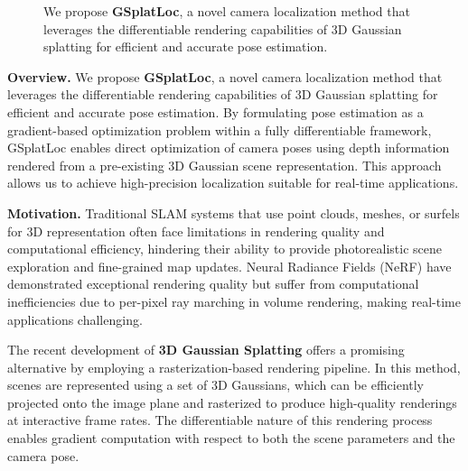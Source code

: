 \documentclass[twocolumn]{article} %
\begin{document}
\begin{figure}[!t]
\vspace{-2cm}
\centering
{}
\caption{We propose \textbf{GSplatLoc}, a novel camera localization method that leverages the differentiable rendering capabilities of 3D Gaussian splatting for efficient and accurate pose estimation.}
\label{fig:cross-column-image}
\end{figure}

\textbf{Overview.} We propose \textbf{GSplatLoc}, a novel camera
localization method that leverages the differentiable rendering
capabilities of 3D Gaussian splatting for efficient and accurate pose
estimation. By formulating pose estimation as a gradient-based
optimization problem within a fully differentiable framework, GSplatLoc
enables direct optimization of camera poses using depth information
rendered from a pre-existing 3D Gaussian scene representation. This
approach allows us to achieve high-precision localization suitable for
real-time applications.

\textbf{Motivation.} Traditional SLAM systems that use point clouds,
meshes, or surfels for 3D representation often face limitations in
rendering quality and computational efficiency, hindering their ability
to provide photorealistic scene exploration and fine-grained map
updates. Neural Radiance Fields (NeRF)
\cite{mildenhallNeRFRepresentingScenes2022} have demonstrated
exceptional rendering quality but suffer from computational
inefficiencies due to per-pixel ray marching in volume rendering, making
real-time applications challenging.

The recent development of \textbf{3D Gaussian Splatting}
\cite{kerbl3DGaussianSplatting2023} offers a promising alternative
by employing a rasterization-based rendering pipeline. In this method,
scenes are represented using a set of 3D Gaussians, which can be
efficiently projected onto the image plane and rasterized to produce
high-quality renderings at interactive frame rates. The differentiable
nature of this rendering process enables gradient computation with
respect to both the scene parameters and the camera pose.
\end{document}
